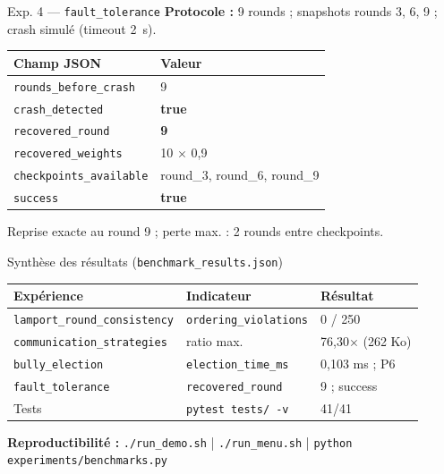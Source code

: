 \documentclass[11pt,french]{beamer}
\begin{document}
\begin{frame}{Exp. 4 --- \texttt{fault\_tolerance}}
  \textbf{Protocole :} 9 rounds ; snapshots rounds 3, 6, 9 ; crash simulé (timeout 2~s).

  \vspace{0.2cm}
  \scriptsize
  \begin{tabular}{@{}ll@{}}
    \toprule
    \textbf{Champ JSON} & \textbf{Valeur} \\
    \midrule
    \texttt{rounds\_before\_crash} & 9 \\
    \texttt{crash\_detected} & \textbf{true} \\
    \texttt{recovered\_round} & \textbf{9} \\
    \texttt{recovered\_weights} & 10 $\times$ 0,9 \\
    \texttt{checkpoints\_available} & round\_3, round\_6, round\_9 \\
    \texttt{success} & \textbf{true} \\
    \bottomrule
  \end{tabular}

  \vspace{0.3cm}
  \small Reprise exacte au round 9 ; perte max. : 2 rounds entre checkpoints.
\end{frame}

\begin{frame}{Synthèse des résultats (\texttt{benchmark\_results.json})}
  \scriptsize
  \begin{tabular}{@{}lll@{}}
    \toprule
    \textbf{Expérience} & \textbf{Indicateur} & \textbf{Résultat} \\
    \midrule
    \texttt{lamport\_round\_consistency} & \texttt{ordering\_violations} & 0 / 250 \\
    \texttt{communication\_strategies} & ratio max. & 76,30$\times$ (262 Ko) \\
    \texttt{bully\_election} & \texttt{election\_time\_ms} & 0,103 ms ; P6 \\
    \texttt{fault\_tolerance} & \texttt{recovered\_round} & 9 ; success \\
    Tests & \texttt{pytest tests/ -v} & 41/41 \\
    \bottomrule
  \end{tabular}

  \vspace{0.4cm}
  \small\textbf{Reproductibilité :}
  \texttt{./run\_demo.sh} \quad|\quad
  \texttt{./run\_menu.sh} \quad|\quad
  \texttt{python experiments/benchmarks.py}
\end{frame}
\end{document}
